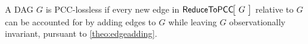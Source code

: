 \begin{prop}\label{prop:PCClossless}
A DAG $G$ is PCC-lossless if every new edge in $\NamedFunction{ReduceToPCC}{\!G\!}$ relative to $G$ can be accounted for by adding edges to $G$ while leaving $G$ observationally invariant, pursuant to \cref{theo:edgeadding}.
\end{prop}

